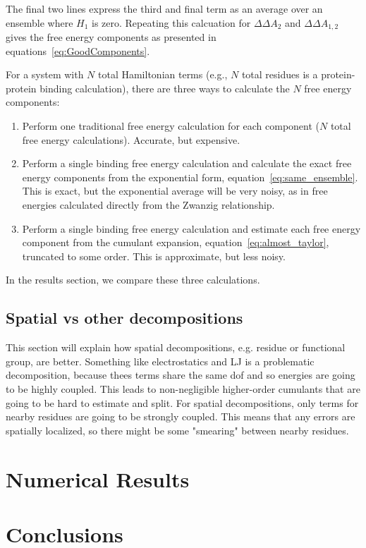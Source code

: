 \documentclass{article}
\begin{document}
The final two lines express the third and final term as an average over an ensemble where $H_1$ is zero. 
Repeating this calcuation for $\Delta \Delta A_2$ and $\Delta \Delta A_{1,2}$ gives the free energy components as presented in equations~\ref{eq:GoodComponents}. 

For a system with $N$ total Hamiltonian terms (e.g., $N$ total residues is a protein-protein binding calculation), there are three ways to calculate the $N$ free energy components: 
\begin{enumerate}
	\item Perform one traditional free energy calculation for each component ($N$ total free energy calculations). Accurate, but expensive.
	\item Perform a single binding free energy calculation and calculate the exact free energy components from the exponential form, equation~\ref{eq:same_ensemble}. This is exact, but the exponential average will be very noisy, as in free energies calculated directly from the Zwanzig relationship.
	\item Perform a single binding free energy calculation and estimate each free energy component from the cumulant expansion, equation~\ref{eq:almost_taylor}, truncated to some order. This is approximate, but less noisy. 
\end{enumerate}
In the results section, we compare these three calculations. 


\subsection{Spatial vs other decompositions}

This section will explain how spatial decompositions, e.g. residue or functional group, are better. Something like electrostatics and LJ is a problematic decomposition, because thees terms share the same dof and so energies are going to be highly coupled. This leads to non-negligible higher-order cumulants that are going to be hard to estimate and split. For spatial decompositions, only terms for nearby residues are going to be strongly coupled. This means that any errors are spatially localized, so there might be some "smearing" between nearby residues.

\section{Numerical Results}


\section{Conclusions}
\end{document}
